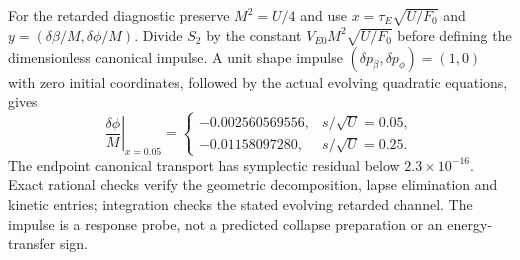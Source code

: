 \documentclass[12pt,a4paper]{article}
\begin{document}
For the retarded diagnostic preserve $M^2=U/4$ and use
$x=\tau_E\sqrt{U/F_0}$ and
$y=(\delta\beta/M,\delta\phi/M)$. Divide $S_2$ by the constant
$V_{E0}M^2\sqrt{U/F_0}$ before defining the dimensionless canonical
impulse. A unit shape impulse $(\delta p_\beta,\delta p_\phi)=(1,0)$
with zero initial coordinates, followed by the actual evolving quadratic
equations, gives
\[
 \left.\frac{\delta\phi}{M}\right|_{x=0.05}
 =\begin{cases}-0.002560569556,&s/\sqrt U=0.05,\\
                -0.01158097280,&s/\sqrt U=0.25.
   \end{cases}
\]
The endpoint canonical transport has symplectic residual below
$2.3\times10^{-16}$. Exact rational checks verify the geometric
decomposition, lapse elimination and kinetic entries; integration checks
the stated evolving retarded channel. The impulse is a response probe,
not a predicted collapse preparation or an energy-transfer sign.
\end{document}
